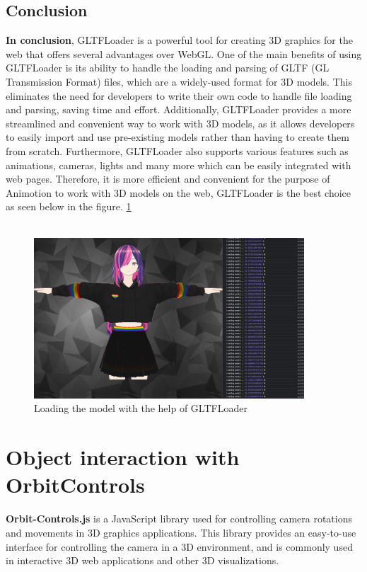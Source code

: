 \subsection{Conclusion}
\textbf{In conclusion}, GLTFLoader is a powerful tool for creating 3D graphics for the web that 
offers several advantages over WebGL. One of the main benefits of using GLTFLoader is 
its ability to handle the loading and parsing of GLTF (GL Transmission Format) files, 
which are a widely-used format for 3D models. This eliminates the need for developers 
to write their own code to handle file loading and parsing, saving time and effort. 
Additionally, GLTFLoader provides a more streamlined and convenient way to work with 
3D models, as it allows developers to easily import and use pre-existing models rather 
than having to create them from scratch. Furthermore, GLTFLoader also supports various 
features such as animations, cameras, lights and many more which can be easily integrated 
with web pages. Therefore, it is more efficient and convenient for the purpose of Animotion 
to work with 3D models on the web, GLTFLoader is the best choice as seen below in the figure. \ref{fig:gltfloader}
\\
\\
\begin{figure}[htb]
    \centering
    \includegraphics[width=0.9\textwidth]{pics/GLTFLoader.png}
    \caption{Loading the model with the help of GLTFLoader}
    \label{fig:gltfloader}
\end{figure}
\newpage
\section{Object interaction with OrbitControls}
\author{Romeo Bhuiyan}
\textbf{Orbit-Controls.js} is a JavaScript library used for controlling camera rotations 
and movements in 3D graphics applications. This library provides an easy-to-use 
interface for controlling the camera in a 3D environment, and is commonly used in 
interactive 3D web applications and other 3D visualizations.

